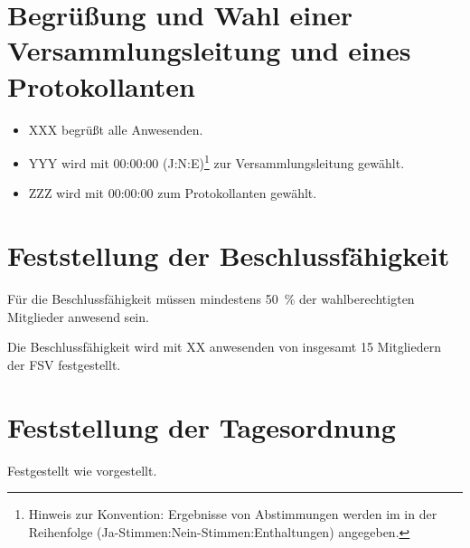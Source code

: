 

\renewcommand{\protokolldatum}{dd.mm.yyyy}
\renewcommand{\protokollbeginn}{hh:mm Uhr}
\renewcommand{\protokollende}{hh:mm Uhr}
\renewcommand{\protokollant}{Protokollant}
\renewcommand{\protokollort}{StudiO, Wilhelm-Klemm-Str.\ 9, 48149 Münster}
\renewcommand{\protokollanwesend}{Namen}
\renewcommand{\protokollweitere}{Namen}


\protokolltitlepagekonstituierend

\section{Begrüßung und Wahl einer Versammlungsleitung und eines Protokollanten}
\begin{itemize}
	\item XXX begrüßt alle Anwesenden.
	\item YYY wird mit 00:00:00 (J:N:E)\footnote{Hinweis zur Konvention: Ergebnisse von Abstimmungen werden im in der Reihenfolge (Ja-Stimmen:Nein-Stimmen:Enthaltungen) angegeben.} zur Versammlungsleitung gewählt.
	\item ZZZ wird mit 00:00:00 zum Protokollanten gewählt.
\end{itemize}

\section{Feststellung der Beschlussfähigkeit}
Für die Beschlussfähigkeit müssen mindestens \SI{50}{\percent} der wahlberechtigten Mitglieder anwesend sein.

Die Beschlussfähigkeit wird mit XX anwesenden von insgesamt 15 Mitgliedern der FSV festgestellt.

\section{Feststellung der Tagesordnung}
Festgestellt wie vorgestellt.

